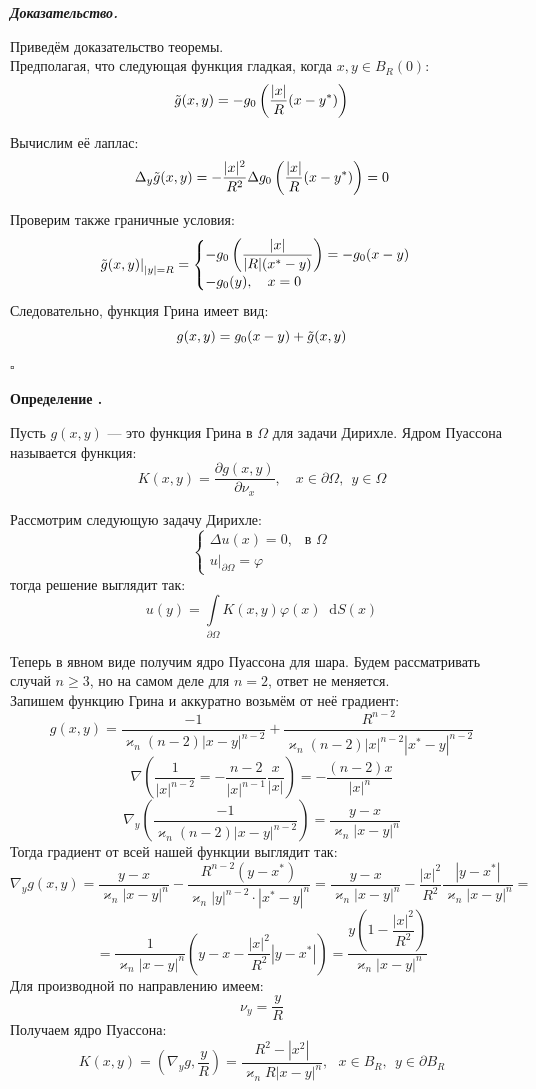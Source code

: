 \documentclass[11pt,a4paper]{report}
\numberwithin{equation}{section}
\numberwithin{figure}{chapter}
\numberwithin{table}{chapter}
\newif\ifinmathphysstatement
\newenvironment{mydef}[1][]{%
    \refstepcounter{defctr}%
    \inmathphysstatementtrue
    \begin{tcolorbox}[mathphysblock,colframe=defcolor,colback=defcolor!3,#1]
    \textbf{\color{defcolor}Определение \thedefctr.}\par\smallskip
}{%
    \end{tcolorbox}
    \inmathphysstatementfalse
}
\newenvironment{myproof}{%
    \begin{tcolorbox}[mathphysblock,colframe=proofcolor!65,colback=proofcolor!2,boxrule=0.5pt]
    \textit{\textbf{Доказательство.}}\par\smallskip
}{%
    \hfill$\square$
    \end{tcolorbox}
}
\newcommand{\p}{\partial}
\newcommand{\dd}{\mathop{}\!\mathrm{d}}
\newcommand{\skobka}[1]{\left( #1 \right)}
\renewcommand{\phi}{\varphi}
\begin{document}
\begin{myproof}
    Приведём доказательство теоремы.\\
    Предполагая, что следующая функция гладкая, когда $x,y \in B_R(0)$:
    \[
\Tilde{g}(x,y) = -g_0\skobka{\dfrac{|x|}{R}(x-y^*)}
\]

Вычислим её лаплас:
\[
\Delta_y \Tilde{g}(x,y) = -\dfrac{|x|^2}{R^2}\Delta g_0\skobka{\dfrac{|x|}{R}(x-y^*)} = 0
\]

Проверим также граничные условия:
\[\left.\Tilde{g}(x,y)\right|_{|y|=R}=\begin{cases}
    -g_0\skobka{\dfrac{|x|}{|R|(x^*-y)}}=-g_0(x-y)\\
    -g_0(y), \quad x=0
\end{cases}\]
Следовательно, функция Грина имеет вид:
\[g(x,y)=g_0(x-y)+\Tilde{g}(x,y)\]
\end{myproof}


\begin{mydef}
    Пусть $g(x,y)$ --- это функция Грина в $\Omega$ для задачи Дирихле. Ядром Пуассона называется функция:
\[
K(x,y) = \dfrac{\p g(x,y)}{\p\nu_x}, \quad x\in\p\Omega, \ \ y\in\Omega
\]
\end{mydef}

Рассмотрим следующую задачу Дирихле:
\[
\begin{cases}
    \Delta u(x) = 0, \ \ \text{ в }\Omega\\
    u\Big|_{\p\Omega} = \phi
\end{cases}
\] тогда решение выглядит так:
\[u(y) = \int\limits_{\p\Omega}K(x,y)\phi(x)\dd S(x)\]

Теперь в явном виде получим ядро Пуассона для шара. Будем рассматривать случай $n\geq 3$, но на самом деле для $n=2$, ответ не меняется.\\
Запишем функцию Грина и аккуратно возьмём от неё градиент:
\[g(x,y) = \dfrac{-1}{\varkappa_n(n-2)|x-y|^{n-2}} + \dfrac{R^{n-2}}{\varkappa_n(n-2)|x|^{n-2}|x^*-y|^{n-2}}\]
\[\nabla \skobka{\dfrac{1}{|x|^{n-2}}=-\dfrac{n-2}{|x|^{n-1}}\dfrac{x}{|x|}}=-\dfrac{(n-2)x}{|x|^n}\]
\[\nabla_y\skobka{\dfrac{-1}{\varkappa_n(n-2)|x-y|^{n-2}}}=\dfrac{y-x}{\varkappa_n|x-y|^n}\]
Тогда градиент от всей нашей функции выглядит так:
\[
\nabla_y g(x,y) = \dfrac{y-x}{\varkappa_n|x-y|^n} - \dfrac{R^{n-2}(y-x^*)}{\varkappa_n|y|^{n-2}\cdot|x^*-y|^{n}}=\dfrac{y-x}{\varkappa_n|x-y|^n}-\dfrac{|x|^2}{R^2}\dfrac{|y-x^*|}{\varkappa_n|x-y|^n}=
\]
\[=\dfrac{1}{\varkappa_n|x-y|^n}\skobka{y-x-\dfrac{|x|^2}{R^2}|y-x^*|}=\dfrac{y\skobka{1-\dfrac{|x|^2}{R^2}}}{\varkappa_n|x-y|^n}\]
Для производной по направлению имеем:
\[\nu_y=\dfrac{y}{R}\]
Получаем ядро Пуассона:
\[
K(x,y) = \skobka{\nabla_yg,\dfrac{y}{R}} = \dfrac{R^2 - |x^2|}{\varkappa_nR|x-y|^n}, \ \ \ x\in B_R, \ \ y\in\p B_R
\]
\end{document}
